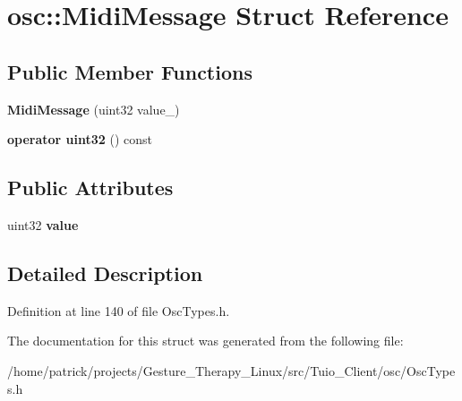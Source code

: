 \hypertarget{structosc_1_1_midi_message}{}\section{osc\+:\+:Midi\+Message Struct Reference}
\label{structosc_1_1_midi_message}
\subsection*{Public Member Functions}
\begin{DoxyCompactItemize}
\item 
\mbox{\label{structosc_1_1_midi_message_aa261277668908653179b9269b9a686e1}} 
{\bfseries Midi\+Message} (uint32 value\+\_\+)
\item 
\mbox{\label{structosc_1_1_midi_message_a6f348df6514e2227fc1291bc19c27336}} 
{\bfseries operator uint32} () const
\end{DoxyCompactItemize}
\subsection*{Public Attributes}
\begin{DoxyCompactItemize}
\item 
\mbox{\label{structosc_1_1_midi_message_a0cc46e6902f6d314072bd395a199e8ba}} 
uint32 {\bfseries value}
\end{DoxyCompactItemize}


\subsection{Detailed Description}


Definition at line 140 of file Osc\+Types.\+h.



The documentation for this struct was generated from the following file\+:\begin{DoxyCompactItemize}
\item 
/home/patrick/projects/\+Gesture\+\_\+\+Therapy\+\_\+\+Linux/src/\+Tuio\+\_\+\+Client/osc/Osc\+Types.\+h\end{DoxyCompactItemize}
